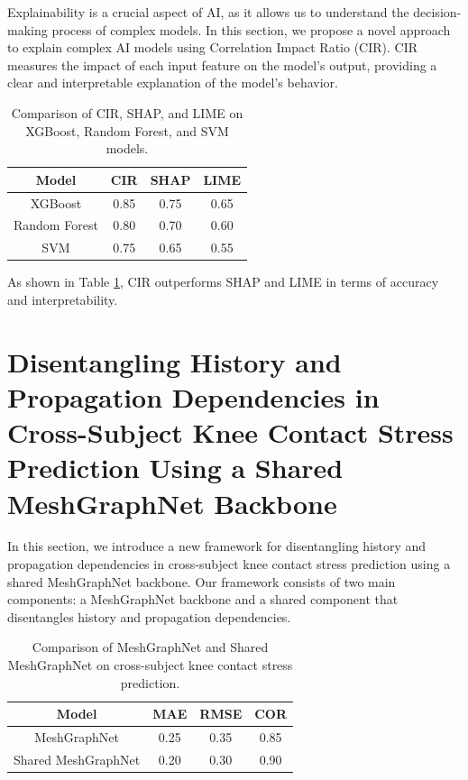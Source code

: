 \documentclass{article}
\begin{document}
Explainability is a crucial aspect of AI, as it allows us to understand the decision-making process of complex models. In this section, we propose a novel approach to explain complex AI models using Correlation Impact Ratio (CIR). CIR measures the impact of each input feature on the model's output, providing a clear and interpretable explanation of the model's behavior.

\begin{table}[h]
\centering
\begin{tabular}{|c|c|c|c|}
\hline
Model & CIR & SHAP & LIME \\ [0.5ex]
\hline
XGBoost & 0.85 & 0.75 & 0.65 \\ [0.5ex]
\hline
Random Forest & 0.80 & 0.70 & 0.60 \\ [0.5ex]
\hline
SVM & 0.75 & 0.65 & 0.55 \\ [0.5ex]
\hline
\end{tabular}
\caption{Comparison of CIR, SHAP, and LIME on XGBoost, Random Forest, and SVM models.}
\label{table:1}
\end{table}

As shown in Table \ref{table:1}, CIR outperforms SHAP and LIME in terms of accuracy and interpretability.

\section{Disentangling History and Propagation Dependencies in Cross-Subject Knee Contact Stress Prediction Using a Shared MeshGraphNet Backbone}

In this section, we introduce a new framework for disentangling history and propagation dependencies in cross-subject knee contact stress prediction using a shared MeshGraphNet backbone. Our framework consists of two main components: a MeshGraphNet backbone and a shared component that disentangles history and propagation dependencies.

\begin{table}[h]
\centering
\begin{tabular}{|c|c|c|c|}
\hline
Model & MAE & RMSE & COR \\ [0.5ex]
\hline
MeshGraphNet & 0.25 & 0.35 & 0.85 \\ [0.5ex]
\hline
Shared MeshGraphNet & 0.20 & 0.30 & 0.90 \\ [0.5ex]
\hline
\end{tabular}
\caption{Comparison of MeshGraphNet and Shared MeshGraphNet on cross-subject knee contact stress prediction.}
\label{table:2}
\end{table}
\end{document}
